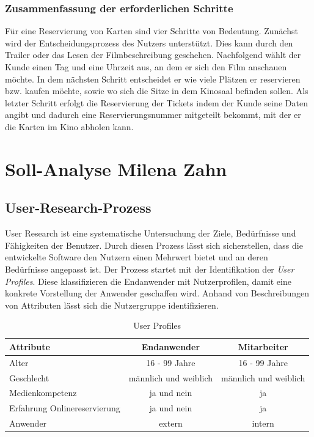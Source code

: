 	\subsubsection{Zusammenfassung der erforderlichen Schritte} 
	Für eine Reservierung von Karten sind vier Schritte von Bedeutung. Zunächst wird der Entscheidungsprozess des Nutzers unterstützt. Dies kann durch den Trailer oder das Lesen der Filmbeschreibung geschehen. Nachfolgend wählt der Kunde einen Tag und eine Uhrzeit aus, an dem er sich den Film anschauen möchte. In dem nächsten Schritt entscheidet er wie viele Plätzen er reservieren bzw. kaufen möchte, sowie wo sich die Sitze in dem Kinosaal befinden sollen. Als letzter Schritt erfolgt die Reservierung der Tickets indem der Kunde seine Daten angibt und dadurch eine Reservierungsnummer mitgeteilt bekommt, mit der er die Karten im Kino abholen kann.
	
	\section[Soll-Analyse]{Soll-Analyse {\hfill \normalsize Milena Zahn}}
		
	 	\subsection{User-Research-Prozess} 
	 	User Research ist eine systematische Untersuchung der Ziele, Bedürfnisse und Fähigkeiten der Benutzer\autocite[Vgl.][S. 6]{Schumacher.2010}.
	 	Durch diesen Prozess lässt sich sicherstellen, dass die entwickelte Software den Nutzern einen Mehrwert bietet und an deren Bedürfnisse angepasst ist.
		Der Prozess startet mit der Identifikation der \textit{User Profiles}. Diese klassifizieren die Endanwender mit Nutzerprofilen, damit eine konkrete Vorstellung der Anwender geschaffen wird. Anhand von Beschreibungen von Attributen lässt sich die Nutzergruppe identifizieren.
		
		\begin{table}[H]
			\centering
			\begin{tabular}{p{} || c | c }
				\textbf{Attribute} & \textbf{Endanwender} & \textbf{Mitarbeiter} \\\toprule
				Alter &  16 - 99 Jahre &  16 - 99 Jahre \\
				Geschlecht &  männlich und weiblich &  männlich und weiblich  \\
				Medienkompetenz &  ja und nein &  ja  \\
				Erfahrung Onlinereservierung &  ja und nein &  ja  \\
				Anwender &  extern &  intern  \\
			\end{tabular}
			\caption[User Profiles]{\label{tab:tabelleUserProfile}User Profiles }
		\end{table}
		
